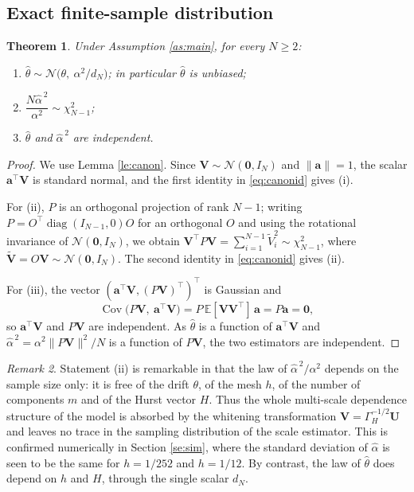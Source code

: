 \documentclass[11pt,reqno]{amsart}
\numberwithin{equation}{section}
\theoremstyle{plain}
\newtheorem{theorem}{Theorem}[section]
\theoremstyle{definition}
\theoremstyle{remark}
\newtheorem{remark}[theorem]{Remark}
\newcommand{\bU}{\mathbf{U}}
\newcommand{\bV}{\mathbf{V}}
\newcommand{\ba}{\mathbf{a}}
\newcommand{\bze}{\mathbf{0}}
\newcommand{\GH}{\Gamma_H}
\newcommand{\E}{\mathbb{E}}
\newcommand{\Norm}{\mathcal{N}}
\DeclareMathOperator{\Cov}{Cov}
\begin{document}
\subsection{Exact finite-sample distribution}

\begin{theorem}\label{th:exactlaw}
Under Assumption \ref{as:main}, for every $N\ge2$:
\begin{enumerate}[label=\textup{(\roman*)}]
\item $\widehat\theta\sim\Norm\bigl(\theta,\ \alpha^{2}/d_N\bigr)$; in particular
      $\widehat\theta$ is unbiased;
\item $\dfrac{N\widehat\alpha^{\,2}}{\alpha^{2}}\sim\chi^{2}_{N-1}$;
\item $\widehat\theta$ and $\widehat\alpha^{\,2}$ are independent.
\end{enumerate}
\end{theorem}

\begin{proof}
We use Lemma \ref{le:canon}. Since $\bV\sim\Norm(\bze,I_N)$ and $\|\ba\|=1$, the scalar
$\ba^{\top}\bV$ is standard normal, and the first identity in \eqref{eq:canonid} gives
(i).

For (ii), $P$ is an orthogonal projection of rank $N-1$; writing
$P=O^{\top}\operatorname{diag}(I_{N-1},0)O$ for an orthogonal $O$ and using the
rotational invariance of $\Norm(\bze,I_N)$, we obtain
$\bV^{\top}P\bV=\sum_{i=1}^{N-1}\widetilde V_i^{2}\sim\chi^{2}_{N-1}$, where
$\widetilde{\bV}=O\bV\sim\Norm(\bze,I_N)$. The second identity in \eqref{eq:canonid}
gives (ii).

For (iii), the vector $(\ba^{\top}\bV,(P\bV)^{\top})^{\top}$ is Gaussian and
\[
  \Cov\bigl(P\bV,\ \ba^{\top}\bV\bigr)=P\,\E[\bV\bV^{\top}]\,\ba=P\ba=\bze,
\]
so $\ba^{\top}\bV$ and $P\bV$ are independent. As $\widehat\theta$ is a function of
$\ba^{\top}\bV$ and $\widehat\alpha^{\,2}=\alpha^{2}\|P\bV\|^{2}/N$ is a function of
$P\bV$, the two estimators are independent.
\end{proof}

\begin{remark}\label{re:pivot}
Statement (ii) is remarkable in that the law of $\widehat\alpha^{\,2}/\alpha^{2}$ depends
on the sample size only: it is free of the drift $\theta$, of the mesh $h$, of the number
of components $m$ and of the Hurst vector $H$. Thus the whole multi-scale dependence
structure of the model is absorbed by the whitening transformation $\bV=\GH^{-1/2}\bU$
and leaves no trace in the sampling distribution of the scale estimator. This is
confirmed numerically in Section \ref{se:sim}, where the standard deviation of
$\widehat\alpha$ is seen to be the same for $h=1/252$ and $h=1/12$. By contrast, the law
of $\widehat\theta$ does depend on $h$ and $H$, through the single scalar $d_N$.
\end{remark}
\end{document}
